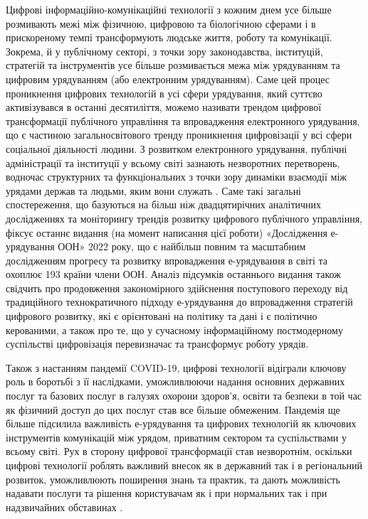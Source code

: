 Цифрові інформаційно-комунікаційні технології з кожним днем усе більше розмивають межі між фізичною, цифровою та біологічною сферами і в прискореному темпі трансформують людське життя, роботу та комунікації. Зокрема, й у публічному секторі, з точки зору законодавства, інституцій, стратегій та інструментів усе більше розмивається межа між урядуванням та цифровим урядуванням (або електронним урядуванням). Саме цей процес проникнення цифрових технологій в усі сфери урядування, який суттєво активізувався в останні десятиліття, можемо називати трендом цифрової трансформації публічного управління та впровадження електронного урядування, що є частиною загальносвітового тренду проникнення цифровізації у всі сфери соціальної діяльності людини. З розвитком електронного урядування, публічні адміністрації та інституції у всьому світі зазнають незворотних перетворень, водночас структурних та функціональних з точки зору динаміки взаємодії між урядами держав та людьми, яким вони служать \cite[22]{book:un_e_govt_survey_2022}. Саме такі загальні спостереження, що базуються на більш ніж двадцятирічних аналітичних дослідженнях та моніторингу трендів розвитку цифрового публічного управління, фіксує останнє видання (на момент написання цієї роботи) «Дослідження е-урядування ООН» 2022 року, що є найбільш повним та масштабним дослідженням прогресу та розвитку впровадження е-урядування в світі та охоплює 193 країни члени ООН. Аналіз підсумків останнього видання також свідчить про продовження закономірного здійснення поступового переходу від традиційного технократичного підходу е-урядування до впровадження стратегій цифрового розвитку, які є орієнтовані на політику та дані і є політично керованими, а також про те, що у сучасному інформаційному постмодерному суспільстві цифровізація перевизначає та трансформує роботу урядів. 

Також з настанням пандемії COVID-19, цифрові технології відіграли ключову роль в боротьбі з її наслідками, уможливлюючи надання основних державних послуг та базових послуг в галузях охорони здоров'я, освіти та безпеки в той час як фізичний доступ до цих послуг став все більше обмеженим. Пандемія ще більше підсилила важливість е-урядування та цифрових технологій як ключових інструментів комунікацій між урядом, приватним сектором та суспільствами у всьому світі. Рух в сторону цифрової трансформації став незворотнім, оскільки цифрові технології роблять важливий внесок як в державний так і в регіональний розвиток, уможливлюють поширення знань та практик, та дають можливість надавати послуги та рішення користувачам як і при нормальних так і при надзвичайних обставинах \cite[32]{book:un_e_govt_survey_2022}.

